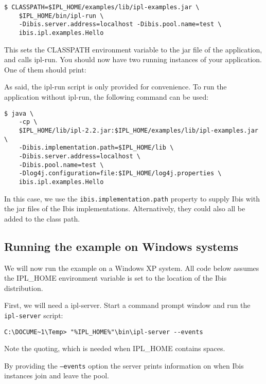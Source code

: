 \documentclass[a4paper,10pt]{article}
\begin{document}
\noindent
{\small
\begin{verbatim}
$ CLASSPATH=$IPL_HOME/examples/lib/ipl-examples.jar \
    $IPL_HOME/bin/ipl-run \
    -Dibis.server.address=localhost -Dibis.pool.name=test \
    ibis.ipl.examples.Hello
\end{verbatim}
}
\noindent

This sets the CLASSPATH environment variable to the jar file of the
application, and calls ipl-run. You should now have two running
instances of your application. One of them should print:

\noindent {\small \begin{verbatim} Server received: Hi there
\end{verbatim} } \noindent 

As said, the ipl-run script is only provided for convenience. To run
the application without ipl-run, the following command can be used:

\noindent
{\small
\begin{verbatim}
$ java \
    -cp \
    $IPL_HOME/lib/ipl-2.2.jar:$IPL_HOME/examples/lib/ipl-examples.jar \
    -Dibis.implementation.path=$IPL_HOME/lib \
    -Dibis.server.address=localhost \
    -Dibis.pool.name=test \
    -Dlog4j.configuration=file:$IPL_HOME/log4j.properties \
    ibis.ipl.examples.Hello
\end{verbatim}
}
\noindent

In this case, we use the \texttt{ibis.implementation.path} property to supply Ibis
with the jar files of the Ibis implementations. Alternatively, they
could also all be added to the class path.

\subsection{Running the example on Windows systems}

We will now run the example on a Windows XP system.
All code below assumes the IPL\_HOME
environment variable is set to the location of the Ibis distribution.

First, we will need a ipl-server. Start a command prompt window and
run the \texttt{ipl-server} script:
\noindent
{\small
\begin{verbatim}
C:\DOCUME~1\Temp> "%IPL_HOME%"\bin\ipl-server --events
\end{verbatim}
}
\noindent

Note the quoting, which is needed when IPL\_HOME contains spaces.

By providing the \texttt{--events} option the server 
prints information on when Ibis instances join and leave the pool.
\end{document}
